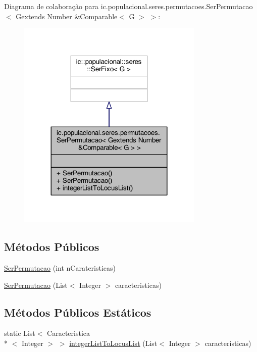 Diagrama de colaboração para ic.\-populacional.\-seres.\-permutacoes.\-Ser\-Permutacao$<$ Gextends Number \&Comparable$<$ G $>$ $>$\-:
\nopagebreak
\begin{figure}[H]
\begin{center}
\leavevmode
\includegraphics[width=252pt]{classic_1_1populacional_1_1seres_1_1permutacoes_1_1_ser_permutacao_3_01_gextends_01_number_01_6_33afe6f7f48b31c59f200363d269b55f}
\end{center}
\end{figure}
\subsection*{Métodos Públicos}
\begin{DoxyCompactItemize}
\item 
\hyperlink{classic_1_1populacional_1_1seres_1_1permutacoes_1_1_ser_permutacao_3_01_gextends_01_number_01_6_comparable_3_01_g_01_4_01_4_a42d4a7c8d5b7b4c45e4ab6a42d54da8b}{Ser\-Permutacao} (int n\-Carateristicas)
\item 
\hyperlink{classic_1_1populacional_1_1seres_1_1permutacoes_1_1_ser_permutacao_3_01_gextends_01_number_01_6_comparable_3_01_g_01_4_01_4_a8499e717fb33b65f1f121ea8e82817e1}{Ser\-Permutacao} (List$<$ Integer $>$ caracteristicas)
\end{DoxyCompactItemize}
\subsection*{Métodos Públicos Estáticos}
\begin{DoxyCompactItemize}
\item 
static List$<$ Caracteristica\\*
$<$ Integer $>$ $>$ \hyperlink{classic_1_1populacional_1_1seres_1_1permutacoes_1_1_ser_permutacao_3_01_gextends_01_number_01_6_comparable_3_01_g_01_4_01_4_ad9d44a3ff50b54b535609995f2e25720}{integer\-List\-To\-Locus\-List} (List$<$ Integer $>$ caracteristicas)
\end{DoxyCompactItemize}


